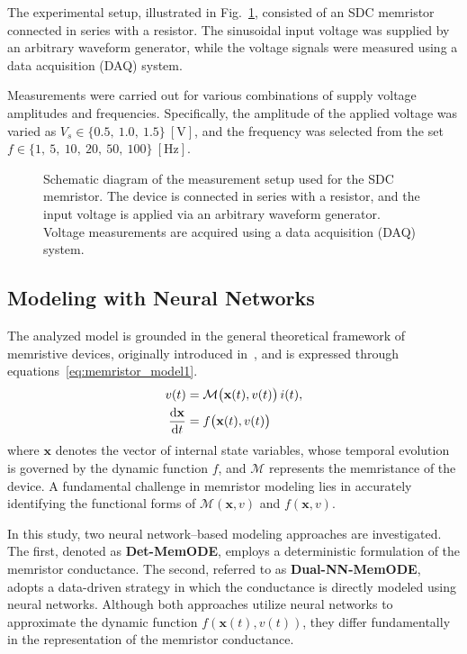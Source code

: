 \documentclass[lettersize,journal]{IEEEtran}
\newcommand{\der}{{\rm d}}
\newcommand{\M}{\mathcal{M}}
\newcommand{\ua}{v}
\newcommand{\ia}{i}
\begin{document}
The experimental setup, illustrated in Fig.~\ref{fig:memristor_setup}, consisted of an SDC memristor connected in series with a resistor. The sinusoidal input voltage was supplied by an arbitrary waveform generator, while the voltage signals were measured using a data acquisition (DAQ) system.

Measurements were carried out for various combinations of supply voltage amplitudes and frequencies. Specifically, the amplitude of the applied voltage was varied as \(V_s \in \{0.5,\ 1.0,\ 1.5\}~\mathrm{[V]}\), and the frequency was selected from the set \(f \in \{1,\ 5,\ 10,\ 20,\ 50,\ 100\}~\mathrm{[Hz]}\).

\begin{figure}[!t]
  \centering
  \resizebox{2.5in}{!}{}
  \vspace{-0.5in}
  \caption{Schematic diagram of the measurement setup used for the SDC memristor. The device is connected in series with a resistor, and the input voltage is applied via an arbitrary waveform generator. Voltage measurements are acquired using a data acquisition (DAQ) system.}
  \label{fig:memristor_setup}
\end{figure}

\subsection{Modeling with Neural Networks}
\noindent The analyzed model is grounded in the general theoretical framework of memristive devices, originally introduced in~\cite{Chua1976}, and is expressed through equations~\eqref{eq:memristor_model1}.
\newcommand{\xvec}{\mathbf{x}}
\begin{align}
  \begin{split}
    \label{eq:memristor_model1}
    \ua(t)                    & = \M \big(\xvec(t),\ua(t)\big) \, \ia(t), \\
    \frac{\der \xvec}{\der t} & = f\big(\xvec(t),\ua(t)\big)
  \end{split}
\end{align}
where \(\xvec\) denotes the vector of internal state variables, whose temporal evolution is governed by the dynamic function \(f\), and \(\M\) represents the memristance of the device. A fundamental challenge in memristor modeling lies in accurately identifying the functional forms of \(\M(\xvec,\ua)\) and \(f(\xvec,\ua)\).

In this study, two neural network–based modeling approaches are investigated. The first, denoted as \textbf{Det-MemODE}, employs a deterministic formulation of the memristor conductance. The second, referred to as \textbf{Dual-NN-MemODE}, adopts a data-driven strategy in which the conductance is directly modeled using neural networks. Although both approaches utilize neural networks to approximate the dynamic function \(f(\xvec(t), \ua(t))\), they differ fundamentally in the representation of the memristor conductance.
\end{document}
